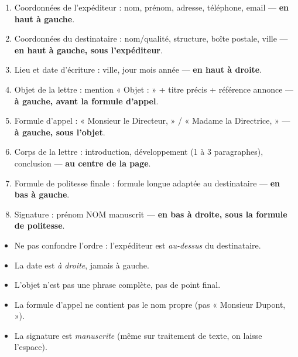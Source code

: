 \documentclass[11pt]{article}
\newcommand{\cle}[1]{{\popxbold\color{popdark}#1}}
\begin{document}
\begin{aretenir}
\begin{enumerate}
\item \cle{Coordonnées de l'expéditeur} : nom, prénom, adresse, téléphone, email — \textbf{en haut à gauche}.
\item \cle{Coordonnées du destinataire} : nom/qualité, structure, boîte postale, ville — \textbf{en haut à gauche, sous l'expéditeur}.
\item \cle{Lieu et date d'écriture} : ville, jour mois année — \textbf{en haut à droite}.
\item \cle{Objet de la lettre} : mention « Objet : » + titre précis + référence annonce — \textbf{à gauche, avant la formule d'appel}.
\item \cle{Formule d'appel} : « Monsieur le Directeur, » / « Madame la Directrice, » — \textbf{à gauche, sous l'objet}.
\item \cle{Corps de la lettre} : introduction, développement (1 à 3 paragraphes), conclusion — \textbf{au centre de la page}.
\item \cle{Formule de politesse finale} : formule longue adaptée au destinataire — \textbf{en bas à gauche}.
\item \cle{Signature} : prénom NOM manuscrit — \textbf{en bas à droite, sous la formule de politesse}.
\end{enumerate}
\end{aretenir}

\begin{attention}
\begin{itemize}
\item Ne pas confondre l'ordre : l'expéditeur est \emph{au-dessus} du destinataire.
\item La date est \emph{à droite}, jamais à gauche.
\item L'objet n'est pas une phrase complète, pas de point final.
\item La formule d'appel ne contient pas le nom propre (pas « Monsieur Dupont, »).
\item La signature est \emph{manuscrite} (même sur traitement de texte, on laisse l'espace).
\end{itemize}
\end{attention}
\end{document}
